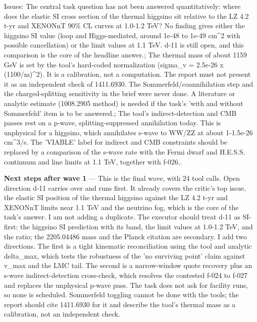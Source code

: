 \documentclass[11pt,a4paper]{article}
\begin{document}
Issues: The central task question has not been answered quantitatively: where does the elastic SI cross section of the thermal higgsino sit relative to the LZ 4.2 t-yr and XENONnT 90\% CL curves at 1.0-1.2 TeV? No finding gives either the higgsino SI value (loop and Higgs-mediated, around 1e-48 to 1e-49 cm\textasciicircum{}2 with possible cancellation) or the limit values at 1.1 TeV. d-11 is still open, and this comparison is the core of the headline answer.; The thermal mass of about 1159 GeV is set by the tool's hard-coded normalization (sigma\_v = 2.5e-26 x (1100/m)\textasciicircum{}2). It is a calibration, not a computation. The report must not present it as an independent check of 1411.6930. The Sommerfeld/coannihilation step and the charged-splitting sensitivity in the brief were never done. A literature or analytic estimate (1008.2905 method) is needed if the task's 'with and without Sommerfeld' item is to be answered.; The tool's indirect-detection and CMB passes rest on a p-wave, splitting-suppressed annihilation today. This is unphysical for a higgsino, which annihilates s-wave to WW/ZZ at about 1-1.5e-26 cm\textasciicircum{}3/s. The 'VIABLE' label for indirect and CMB constraints should be replaced by a comparison of the s-wave rate with the Fermi dwarf and H.E.S.S. continuum and line limits at 1.1 TeV, together with f-026..

\textbf{Next steps after wave 1} --- This is the final wave, with 24 tool calls. Open direction d-11 carries over and runs first. It already covers the critic's top issue, the elastic SI position of the thermal higgsino against the LZ 4.2 t-yr and XENONnT limits near 1.1 TeV and the neutrino fog, which is the core of the task's answer. I am not adding a duplicate. The executor should treat d-11 as SI-first: the higgsino SI prediction with its band, the limit values at 1.0-1.2 TeV, and the ratio; the 2205.04486 mass and the Planck citation are secondary. I add two directions. The first is a tight kinematic reconciliation using the tool and analytic delta\_max, which tests the robustness of the 'no surviving point' claim against v\_max and the LMC tail. The second is a narrow-window quote recovery plus an s-wave indirect-detection cross-check, which resolves the contested f-024 to f-027 and replaces the unphysical p-wave pass. The task does not ask for facility runs, so none is scheduled. Sommerfeld toggling cannot be done with the tools; the report should cite 1411.6930 for it and describe the tool's thermal mass as a calibration, not an independent check.
\end{document}
